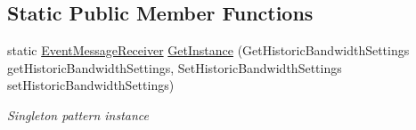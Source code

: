 \subsection*{Static Public Member Functions}
\begin{DoxyCompactItemize}
\item 
static \hyperlink{class_cloud_api_public_1_1_event_message_receiver_1_1_event_message_receiver}{Event\-Message\-Receiver} \hyperlink{class_cloud_api_public_1_1_event_message_receiver_1_1_event_message_receiver_a63842ca35ba9dc442adc8b3dd575033a}{Get\-Instance} (Get\-Historic\-Bandwidth\-Settings get\-Historic\-Bandwidth\-Settings, Set\-Historic\-Bandwidth\-Settings set\-Historic\-Bandwidth\-Settings)
\begin{DoxyCompactList}\small\item\em Singleton pattern instance \end{DoxyCompactList}\end{DoxyCompactItemize}
